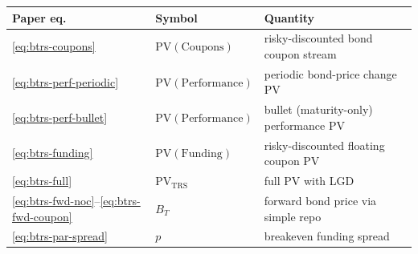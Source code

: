 \documentclass[11pt,a4paper]{article}
\begin{document}
\begin{validation}
\smallskip
\begin{tabular}{@{}p{2.8cm}p{3.8cm}p{6.2cm}@{}}
\toprule
Paper eq.                                 & Symbol                      & Quantity \\
\midrule
\eqref{eq:btrs-coupons}                   & $\mathrm{PV}(\text{Coupons})$       & risky-discounted bond coupon stream \\
\eqref{eq:btrs-perf-periodic}             & $\mathrm{PV}(\text{Performance})$   & periodic bond-price change PV \\
\eqref{eq:btrs-perf-bullet}               & $\mathrm{PV}(\text{Performance})$   & bullet (maturity-only) performance PV \\
\eqref{eq:btrs-funding}                   & $\mathrm{PV}(\text{Funding})$       & risky-discounted floating coupon PV \\
\eqref{eq:btrs-full}                      & $\mathrm{PV}_{\mathrm{TRS}}$        & full PV with LGD \\
\eqref{eq:btrs-fwd-noc}--\eqref{eq:btrs-fwd-coupon} & $B_T$              & forward bond price via simple repo \\
\eqref{eq:btrs-par-spread}                & $p$                          & breakeven funding spread \\
\bottomrule
\end{tabular}
\smallskip


\end{validation}
\end{document}
